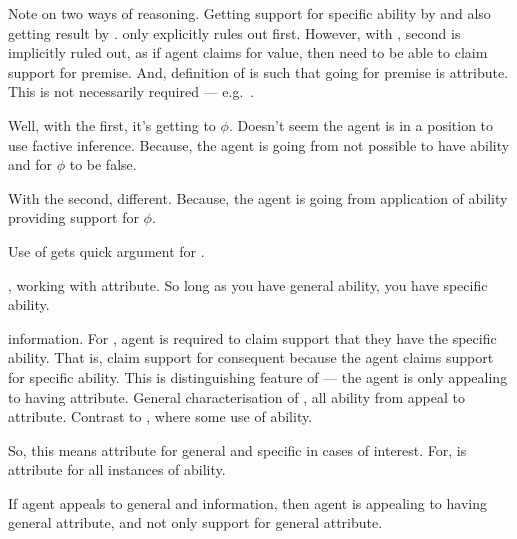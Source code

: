 \begin{note}
  Note on two ways of reasoning.
  Getting support for specific ability by \RBV{} and also getting result by \RBV{}.
  \nI{} only explicitly rules out first.
  However, with \nIm{}, second is implicitly ruled out, as if agent claims for value, then need to be able to claim support for premise.
  And, definition of \AR{} is such that going for premise is attribute.
  This is not necessarily required --- e.g.\ \WR{}.
\end{note}

\hozline{}

\begin{note}
    {
    \color{green}
    Well, with the first, it's getting to \(\phi\).
    Doesn't seem the agent is in a position to use factive inference.
    Because, the agent is going from not possible to have ability and for \(\phi\) to be false.

    With the second, different.
    Because, the agent is going from application of ability providing support for \(\phi\).
  }

  Use of \AR{} gets quick argument for \RBV{}.
\end{note}

\hozline{}

\begin{note}[Application of \nI{} to \AR{}]
  \AR{}, working with attribute.
  So long as you have general ability, you have specific ability.
\end{note}


\begin{note}
  \gsi{} information.
  For \AR{}, agent is required to claim support that they have the specific ability.
  That is, claim support for consequent because the agent claims support for specific ability.
  This is distinguishing feature of \AR{} --- the agent is only appealing to having attribute.
  General characterisation of \AR{}, all ability from appeal to attribute.
  Contrast to \WR{}, where some use of ability.

  So, this means attribute for general and specific in cases of interest.
  For, \AR{} is attribute for all instances of ability.




    If agent appeals to general and information, then agent is appealing to having general attribute, and not only support for general attribute.
\end{note}

